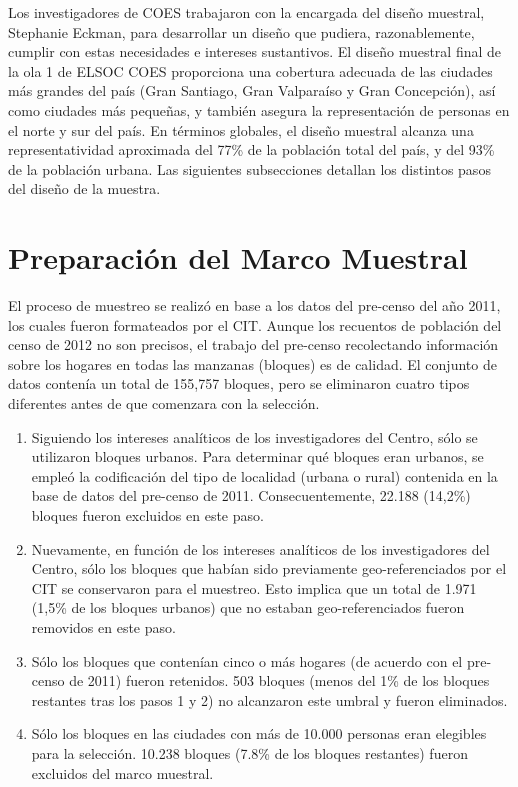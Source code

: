 \documentclass[
  openany]{book}
\begin{document}
Los investigadores de COES trabajaron con la encargada del diseño muestral, Stephanie Eckman, para desarrollar un diseño que pudiera, razonablemente, cumplir con estas necesidades e intereses sustantivos. El diseño muestral final de la ola 1 de ELSOC COES proporciona una cobertura adecuada de las ciudades más grandes del país (Gran Santiago, Gran Valparaíso y Gran Concepción), así como ciudades más pequeñas, y también asegura la representación de personas en el norte y sur del país. En términos globales, el diseño muestral alcanza una representatividad aproximada del 77\% de la población total del país, y del 93\% de la población urbana. Las siguientes subsecciones detallan los distintos pasos del diseño de la muestra.

\hypertarget{preparaciuxf3n-del-marco-muestral}{%
\section{Preparación del Marco Muestral}\label{preparaciuxf3n-del-marco-muestral}}

El proceso de muestreo se realizó en base a los datos del pre-censo del año 2011, los cuales fueron formateados por el CIT. Aunque los recuentos de población del censo de 2012 no son precisos, el trabajo del pre-censo recolectando información sobre los hogares en todas las manzanas (bloques) es de calidad. El conjunto de datos contenía un total de 155,757 bloques, pero se eliminaron cuatro tipos diferentes antes de que comenzara con la selección.

\begin{enumerate}
\def\labelenumi{\arabic{enumi}.}
\item
  Siguiendo los intereses analíticos de los investigadores del Centro, sólo se utilizaron bloques urbanos. Para determinar qué bloques eran urbanos, se empleó la codificación del tipo de localidad (urbana o rural) contenida en la base de datos del pre-censo de 2011. Consecuentemente, 22.188 (14,2\%) bloques fueron excluidos en este paso.
\item
  Nuevamente, en función de los intereses analíticos de los investigadores del Centro, sólo los bloques que habían sido previamente geo-referenciados por el CIT se conservaron para el muestreo. Esto implica que un total de 1.971 (1,5\% de los bloques urbanos) que no estaban geo-referenciados fueron removidos en este paso.
\item
  Sólo los bloques que contenían cinco o más hogares (de acuerdo con el pre-censo de 2011) fueron retenidos. 503 bloques (menos del 1\% de los bloques restantes tras los pasos 1 y 2) no alcanzaron este umbral y fueron eliminados.
\item
  Sólo los bloques en las ciudades con más de 10.000 personas eran elegibles para la selección. 10.238 bloques (7.8\% de los bloques restantes) fueron excluidos del marco muestral.
\end{enumerate}
\end{document}
